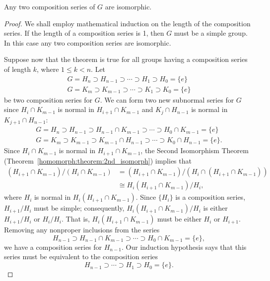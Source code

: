  
\begin{theorem}
Any two composition series of $G$ are isomorphic.
\end{theorem}
 
 
\begin{proof}
We shall employ mathematical induction on the length of the
composition series.  If the length of a composition series is 1, 
then $G$ must be a simple group.  In this case any two composition
series are isomorphic.
 
 
Suppose now that the theorem is true for all groups having a
composition series of length $k$, where $1 \leq k <n$. Let 
\begin{gather*}
G = H_n \supset H_{n-1} \supset \cdots \supset H_1 \supset
H_0 = \{ e \} \\
G = K_m \supset K_{m-1} \supset \cdots \supset K_1 \supset
K_0 = \{ e \}
\end{gather*}
be two composition series for $G$.  We can form two new subnormal
series for $G$ since $H_i \cap K_{m-1}$ is normal in $H_{i+1} \cap
K_{m-1}$ and $K_j \cap H_{n-1}$ is normal in $K_{j+1} \cap H_{n-1}$:
\begin{gather*}
G = H_n \supset H_{n-1} \supset H_{n-1} \cap K_{m-1} \supset 
\cdots \supset H_0 \cap K_{m-1} = \{ e \} \\
G = K_m \supset K_{m-1} \supset K_{m-1} \cap H_{n-1} \supset 
\cdots \supset K_0 \cap H_{n-1} = \{ e \}.
\end{gather*}
Since $H_i \cap K_{m-1}$ is normal in $H_{i+1} \cap K_{m-1}$, the
Second Isomorphism Theorem (Theorem~\ref{homomorph:theorem:2nd_isomorph}) implies that 
\begin{align*}
(H_{i+1} \cap K_{m-1}) / (H_i \cap K_{m-1}) 
& =  (H_{i+1} \cap K_{m-1}) / (H_i \cap ( H_{i+1} \cap K_{m-1} )) \\
& \cong  H_i (H_{i+1} \cap K_{m-1})/ H_i,
\end{align*}
where $H_i$ is normal in $H_i (H_{i+1} \cap K_{m-1})$. Since $\{ H_i
\}$  is a composition series, $H_{i+1} / H_i$ must be simple;
consequently, $H_i (H_{i+1} \cap K_{m-1})/ H_i$ is either $H_{i+1}/
H_i$ or $H_i/H_i$.  That is, $H_i (H_{i+1} \cap K_{m-1})$ must be
either $H_i$ or $H_{i+1}$. Removing any nonproper inclusions from the
series 
\[
H_{n-1} \supset H_{n-1} \cap K_{m-1} \supset 
\cdots \supset H_0 \cap K_{m-1} = \{ e \}, 
\]
we have a composition series for $H_{n-1}$. Our induction hypothesis
says that this series must be equivalent to the composition series
\[
H_{n-1} \supset \cdots \supset H_1 \supset H_0 = \{ e \}.
\]
\end{proof}
